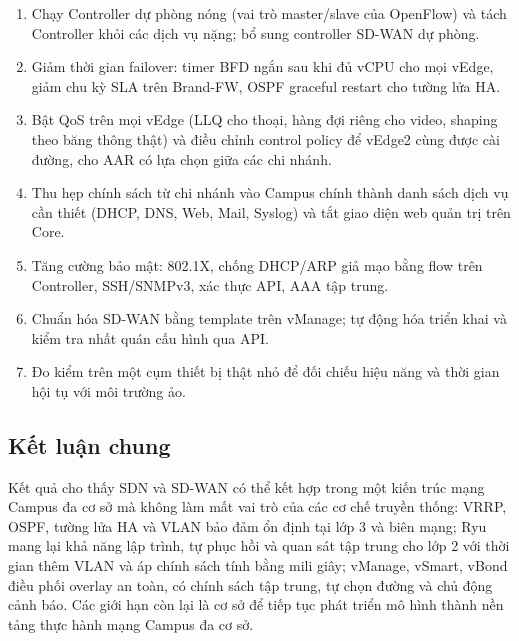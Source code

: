 \begin{enumerate}
    \item Chạy Controller dự phòng nóng (vai trò master/slave của OpenFlow) và tách Controller khỏi các dịch vụ nặng; bổ sung controller SD-WAN dự phòng.
    \item Giảm thời gian failover: timer BFD ngắn sau khi đủ vCPU cho mọi vEdge, giảm chu kỳ SLA trên Brand-FW, OSPF graceful restart cho tường lửa HA.
    \item Bật QoS trên mọi vEdge (LLQ cho thoại, hàng đợi riêng cho video, shaping theo băng thông thật) và điều chỉnh control policy để vEdge2 cùng được cài đường, cho AAR có lựa chọn giữa các chi nhánh.
    \item Thu hẹp chính sách từ chi nhánh vào Campus chính thành danh sách dịch vụ cần thiết (DHCP, DNS, Web, Mail, Syslog) và tắt giao diện web quản trị trên Core.
    \item Tăng cường bảo mật: 802.1X, chống DHCP/ARP giả mạo bằng flow trên Controller, SSH/SNMPv3, xác thực API, AAA tập trung.
    \item Chuẩn hóa SD-WAN bằng template trên vManage; tự động hóa triển khai và kiểm tra nhất quán cấu hình qua API.
    \item Đo kiểm trên một cụm thiết bị thật nhỏ để đối chiếu hiệu năng và thời gian hội tụ với môi trường ảo.
\end{enumerate}

\subsection{Kết luận chung}

Kết quả cho thấy SDN và SD-WAN có thể kết hợp trong một kiến trúc mạng Campus đa cơ sở mà không làm mất vai trò của các cơ chế truyền thống: VRRP, OSPF, tường lửa HA và VLAN bảo đảm ổn định tại lớp 3 và biên mạng; Ryu mang lại khả năng lập trình, tự phục hồi và quan sát tập trung cho lớp 2 với thời gian thêm VLAN và áp chính sách tính bằng mili giây; vManage, vSmart, vBond điều phối overlay an toàn, có chính sách tập trung, tự chọn đường và chủ động cảnh báo. Các giới hạn còn lại là cơ sở để tiếp tục phát triển mô hình thành nền tảng thực hành mạng Campus đa cơ sở.

